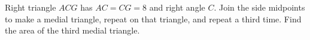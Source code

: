 Right triangle $ACG$ has $AC=CG=8$ and right angle $C$. Join the side midpoints to make a medial triangle, repeat on that triangle, and repeat a third time. Find the area of the third medial triangle.
